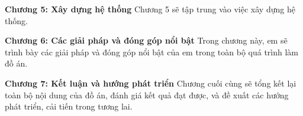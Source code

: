 \documentclass[../index.tex]{subfiles}
\begin{document}
    \textbf{Chương 5: Xây dựng hệ thống}
    \newline
    \indent Chương 5 sẽ tập trung vào việc xây dựng hệ thống.

    \textbf{Chương 6: Các giải pháp và đóng góp nổi bật}
    \newline
    \indent Trong chương này, em sẽ trình bày các giải pháp và đóng góp nổi bật của em trong toàn bộ quá trình làm đồ án.

    \textbf{Chương 7: Kết luận và hướng phát triển}
    \newline
    \indent Chương cuối cùng sẽ tổng kết lại toàn bộ nội dung của đồ án, đánh giá kết quả đạt được, và đề xuất các hướng phát triển, cải tiến trong tương lai.
    
\end{document}
